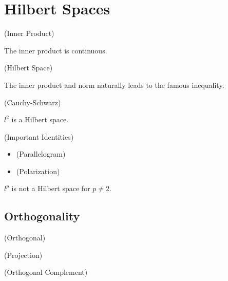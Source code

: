 \documentclass{article}
\begin{document}
\section{Hilbert Spaces}  

\begin{defn}
    (Inner Product)
\end{defn}  

\begin{remark}
    The inner product is continuous.  
\end{remark}

\begin{defn}
    (Hilbert Space)
\end{defn}  

The inner product and norm naturally leads to the famous inequality.  

\begin{prop}
    (Cauchy-Schwarz)
\end{prop}

\begin{eg}
    $l^2$ is a Hilbert space.
\end{eg} 

\begin{prop}
    (Important Identities)
    \begin{itemize}
        \item (Parallelogram)
        \item (Polarization)
    \end{itemize}
\end{prop}  

\begin{prop}
    $l^p$ is not a Hilbert space for $p \neq 2$.
\end{prop}  

\subsection{Orthogonality}  

\begin{defn}
    (Orthogonal)
\end{defn}  

\begin{thm}
    (Projection)
\end{thm}  

\begin{thm}
    (Orthogonal Complement)
\end{thm}
\end{document}

